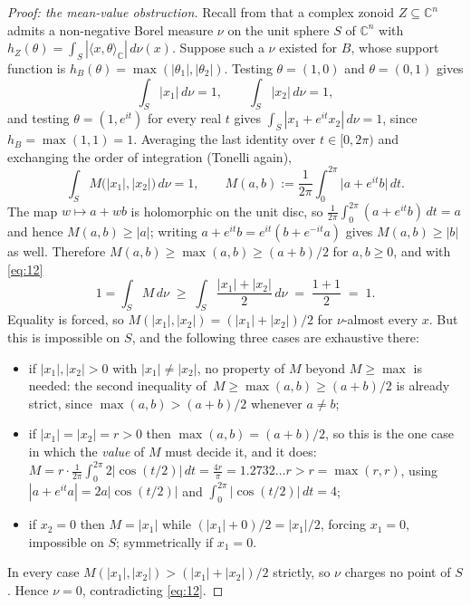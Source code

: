 \documentclass[11pt]{amsart}
\theoremstyle{remark}
\newcommand{\CC}{\mathbb{C}}
\begin{document}
\begin{proof}[Proof: the mean-value obstruction]
Recall from \cite{RSS} that a complex zonoid $Z\subseteq\CC^{n}$ admits a
non-negative Borel measure $\nu$ on the unit sphere $S$ of $\CC^{n}$ with
$h_{Z}(\theta)=\int_{S}|\langle x,\theta\rangle_{\CC}|\,d\nu(x)$. Suppose such a
$\nu$ existed for $B$, whose support function is
$h_{B}(\theta)=\max(|\theta_{1}|,|\theta_{2}|)$. Testing $\theta=(1,0)$ and
$\theta=(0,1)$ gives
\begin{equation}\label{eq:12}
  \int_{S}|x_{1}|\,d\nu=1,\qquad \int_{S}|x_{2}|\,d\nu=1 ,
\end{equation}
and testing $\theta=(1,e^{it})$ for every real $t$ gives
$\int_{S}|x_{1}+e^{it}x_{2}|\,d\nu=1$, since $h_{B}=\max(1,1)=1$. Averaging the
last identity over $t\in[0,2\pi)$ and exchanging the order of integration
(Tonelli again),
\[
  \int_{S}M\bigl(|x_{1}|,|x_{2}|\bigr)\,d\nu=1,\qquad
  M(a,b):=\frac{1}{2\pi}\int_{0}^{2\pi}\bigl|a+e^{it}b\bigr|\,dt .
\]
The map $w\mapsto a+wb$ is holomorphic on the unit disc, so
$\frac{1}{2\pi}\int_{0}^{2\pi}(a+e^{it}b)\,dt=a$ and hence $M(a,b)\ge|a|$;
writing $a+e^{it}b=e^{it}(b+e^{-it}a)$ gives $M(a,b)\ge|b|$ as well. Therefore
$M(a,b)\ge\max(a,b)\ge(a+b)/2$ for $a,b\ge0$, and with \eqref{eq:12}
\[
  1=\int_{S}M\,d\nu\;\ge\;\int_{S}\frac{|x_{1}|+|x_{2}|}{2}\,d\nu
   \;=\;\frac{1+1}{2}\;=\;1 .
\]
Equality is forced, so $M(|x_{1}|,|x_{2}|)=(|x_{1}|+|x_{2}|)/2$ for
$\nu$-almost every $x$. But this is impossible on $S$, and the following three
cases are exhaustive there:
\begin{itemize}
\item if $|x_{1}|,|x_{2}|>0$ with $|x_{1}|\ne|x_{2}|$, no property of $M$ beyond
      $M\ge\max$ is needed: the second inequality of \,$M\ge\max(a,b)\ge(a+b)/2$
      is already strict, since $\max(a,b)>(a+b)/2$ whenever $a\ne b$;
\item if $|x_{1}|=|x_{2}|=r>0$ then $\max(a,b)=(a+b)/2$, so this is the one case
      in which the \emph{value} of $M$ must decide it, and it does:
      $M=r\cdot\frac{1}{2\pi}\int_{0}^{2\pi}2|\cos(t/2)|\,dt=\frac{4r}{\pi}
      =1.2732\ldots r>r=\max(r,r)$, using
      $|a+e^{it}a|=2a|\cos(t/2)|$ and $\int_{0}^{2\pi}|\cos(t/2)|\,dt=4$;
\item if $x_{2}=0$ then $M=|x_{1}|$ while $(|x_{1}|+0)/2=|x_{1}|/2$, forcing
      $x_{1}=0$, impossible on $S$; symmetrically if $x_{1}=0$.
\end{itemize}
In every case $M(|x_{1}|,|x_{2}|)>(|x_{1}|+|x_{2}|)/2$ strictly, so $\nu$ charges
no point of $S$.
Hence $\nu=0$, contradicting \eqref{eq:12}.
\end{proof}
\end{document}
